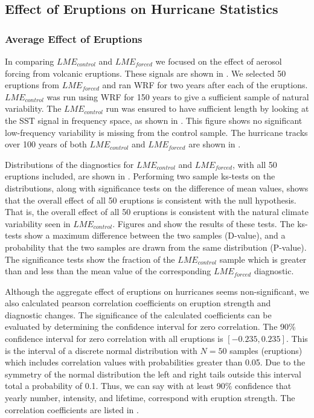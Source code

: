 \documentclass[phd,tocprelim]{cornell}
\begin{document}
\subsection{Effect of Eruptions on Hurricane Statistics}
\subsubsection{Average Effect of Eruptions}
In comparing $LME_{control}$ and $LME_{forced}$ we focused on the 
effect of aerosol forcing from volcanic eruptions. These signals are 
shown in . We selected 50 eruptions 
from $LME_{forced}$ and ran WRF for two years after each of the 
eruptions. $LME_{control}$ was run using WRF for 150 years to give a 
sufficient sample of natural variability. The $LME_{control}$ run was 
ensured to have sufficient length by looking at the SST signal in 
frequency space, as shown in . This figure shows 
no significant low-frequency variability is missing from the control 
sample. The hurricane tracks over 100 years of both $LME_{control}$ 
and $LME_{forced}$ are shown in .
\par
Distributions of the diagnostics for $LME_{control}$ and $LME_{forced}$, 
with all 50 eruptions included, are shown in . 
Performing two sample ks-tests on the distributions, along with 
significance tests on the difference of mean values, shows that the 
overall effect of all 50 eruptions is consistent with the null hypothesis. 
That is, the overall effect of all 50 eruptions is consistent with 
the natural climate variability seen in $LME_{control}$. 
Figures  and  show the results of these tests. 
The ks-tests show a maximum difference between the two samples (D-value), 
and a probability that the two samples are drawn from the same 
distribution (P-value). The significance tests show the fraction 
of the $LME_{control}$ sample which is greater than and less than 
the mean value of the corresponding $LME_{forced}$ diagnostic. 
\par
Although the aggregate effect of eruptions on hurricanes seems 
non-significant, we also calculated pearson correlation coefficients 
on eruption strength and diagnostic changes. The significance of the 
calculated coefficients can be evaluated by determining the confidence 
interval for zero correlation. The 90\% confidence interval for zero 
correlation with all eruptions is $[-0.235,0.235]$. This is the 
interval of a discrete normal distribution with $N=50$ samples 
(eruptions) which includes correlation values with probabilities 
greater than 0.05. Due to the symmetry of the normal distribution 
the left and right tails outside this interval total a probability 
of 0.1. Thus, we can say with at least 90\% confidence that yearly 
number, intensity, and lifetime, correspond with eruption strength. 
The correlation coefficients are listed in .   
\end{document}
